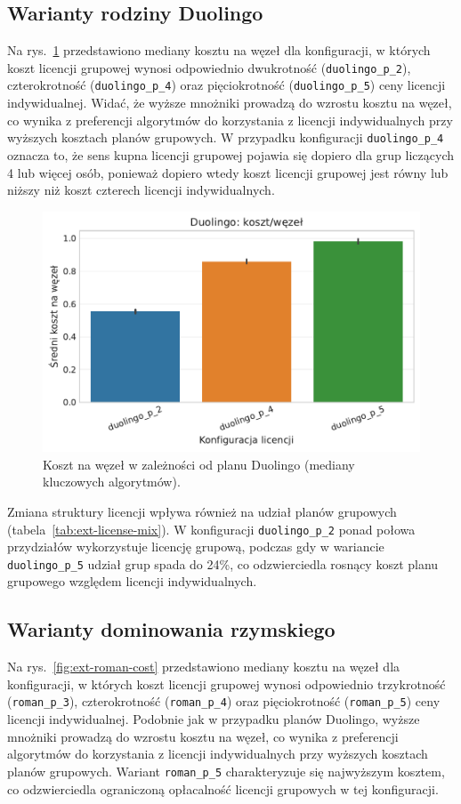 \subsection{Warianty rodziny Duolingo}
Na rys.~\ref{fig:ext-duolingo-cost} przedstawiono mediany kosztu na węzeł dla konfiguracji, w których koszt licencji grupowej wynosi odpowiednio dwukrotność (\texttt{duolingo\_p\_2}), czterokrotność (\texttt{duolingo\_p\_4}) oraz pięciokrotność (\texttt{duolingo\_p\_5}) ceny licencji indywidualnej. Widać, że wyższe mnożniki prowadzą do wzrostu kosztu na węzeł, co wynika z preferencji algorytmów do korzystania z licencji indywidualnych przy wyższych kosztach planów grupowych. W przypadku konfiguracji \texttt{duolingo\_p\_4} oznacza to, że sens kupna licencji grupowej pojawia się dopiero dla grup liczących 4 lub więcej osób, ponieważ dopiero wtedy koszt licencji grupowej jest równy lub niższy niż koszt czterech licencji indywidualnych.

\begin{figure}[H]
  \centering
  \includegraphics[width=0.6\linewidth]{assets/figures/extensions/static/duolingo_cost_per_node_comparison.pdf}
  \caption{Koszt na węzeł w zależności od planu Duolingo (mediany kluczowych algorytmów).}
  \label{fig:ext-duolingo-cost}
\end{figure}

Zmiana struktury licencji wpływa również na udział planów grupowych (tabela~\ref{tab:ext-license-mix}). W konfiguracji \texttt{duolingo\_p\_2} ponad połowa przydziałów wykorzystuje licencję grupową, podczas gdy w wariancie \texttt{duolingo\_p\_5} udział grup spada do 24\%, co odzwierciedla rosnący koszt planu grupowego względem licencji indywidualnych.


\subsection{Warianty dominowania rzymskiego}
Na rys.~\ref{fig:ext-roman-cost} przedstawiono mediany kosztu na węzeł dla konfiguracji, w których koszt licencji grupowej wynosi odpowiednio trzykrotność (\texttt{roman\_p\_3}), czterokrotność (\texttt{roman\_p\_4}) oraz pięciokrotność (\texttt{roman\_p\_5}) ceny licencji indywidualnej. Podobnie jak w przypadku planów Duolingo, wyższe mnożniki prowadzą do wzrostu kosztu na węzeł, co wynika z preferencji algorytmów do korzystania z licencji indywidualnych przy wyższych kosztach planów grupowych. Wariant \texttt{roman\_p\_5} charakteryzuje się najwyższym kosztem, co odzwierciedla ograniczoną opłacalność licencji grupowych w tej konfiguracji.

